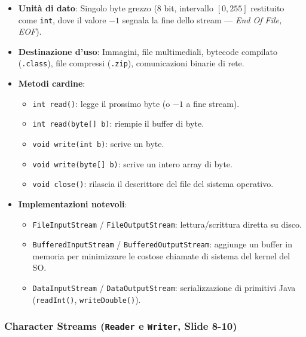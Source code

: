 \documentclass[11pt,a4paper,oneside]{report}
\newcommand{\passthrough}[1]{#1}
\providecommand{\tightlist}{\setlength{\itemsep}{0pt}\setlength{\parskip}{0pt}}
\begin{document}
\begin{itemize}
\tightlist
\item
  \textbf{Unità di dato}: Singolo byte grezzo (8 bit, intervallo
  \([0, 255]\) restituito come \passthrough{\lstinline!int!}, dove il
  valore \(-1\) segnala la fine dello stream --- \emph{End Of File,
  EOF}).
\item
  \textbf{Destinazione d'uso}: Immagini, file multimediali, bytecode
  compilato (\passthrough{\lstinline!.class!}), file compressi
  (\passthrough{\lstinline!.zip!}), comunicazioni binarie di rete.
\item
  \textbf{Metodi cardine}:

  \begin{itemize}
  \tightlist
  \item
    \passthrough{\lstinline!int read()!}: legge il prossimo byte (o
    \(-1\) a fine stream).
  \item
    \passthrough{\lstinline!int read(byte[] b)!}: riempie il buffer di
    byte.
  \item
    \passthrough{\lstinline!void write(int b)!}: scrive un byte.
  \item
    \passthrough{\lstinline!void write(byte[] b)!}: scrive un intero
    array di byte.
  \item
    \passthrough{\lstinline!void close()!}: rilascia il descrittore del
    file del sistema operativo.
  \end{itemize}
\item
  \textbf{Implementazioni notevoli}:

  \begin{itemize}
  \tightlist
  \item
    \passthrough{\lstinline!FileInputStream!} /
    \passthrough{\lstinline!FileOutputStream!}: lettura/scrittura
    diretta su disco.
  \item
    \passthrough{\lstinline!BufferedInputStream!} /
    \passthrough{\lstinline!BufferedOutputStream!}: aggiunge un buffer
    in memoria per minimizzare le costose chiamate di sistema del kernel
    del SO.
  \item
    \passthrough{\lstinline!DataInputStream!} /
    \passthrough{\lstinline!DataOutputStream!}: serializzazione di
    primitivi Java (\passthrough{\lstinline!readInt()!},
    \passthrough{\lstinline!writeDouble()!}).
  \end{itemize}
\end{itemize}

\subsubsection{\texorpdfstring{Character Streams (\texttt{Reader} e
\texttt{Writer}, Slide
8-10)}{Character Streams (Reader e Writer, Slide 8-10)}}\label{chap19_character-streams-reader-e-writer-slide-8-10}
\end{document}
